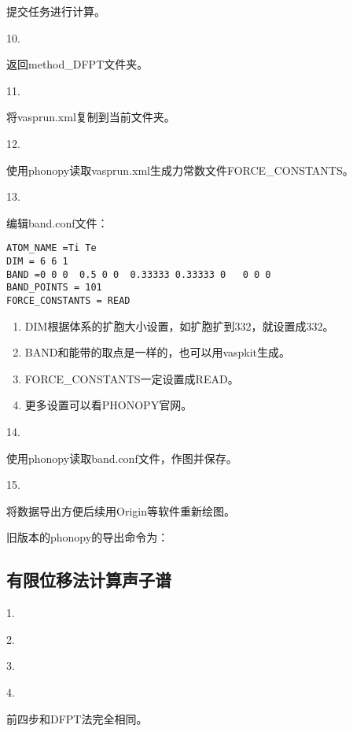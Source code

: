 提交任务进行计算。

10.

返回method\_DFPT文件夹。

11.

将vasprun.xml复制到当前文件夹。

12.

使用phonopy读取vasprun.xml生成力常数文件FORCE\_CONSTANTS。

13.

编辑band.conf文件：
\begin{lstlisting}[caption=band.conf]
ATOM_NAME =Ti Te
DIM = 6 6 1
BAND =0 0 0  0.5 0 0  0.33333 0.33333 0   0 0 0
BAND_POINTS = 101
FORCE_CONSTANTS = READ
\end{lstlisting}

\begin{enumerate}
    \item DIM根据体系的扩胞大小设置，如扩胞扩到332，就设置成332。
    \item BAND和能带的取点是一样的，也可以用vaspkit生成。
    \item FORCE\_CONSTANTS一定设置成READ。
    \item 更多设置可以看PHONOPY官网。
\end{enumerate}

14.

使用phonopy读取band.conf文件，作图并保存。

15.

将数据导出方便后续用Origin等软件重新绘图。

\begin{extend}
  旧版本的phonopy的导出命令为：
\end{extend}

\subsection{有限位移法计算声子谱}\label{sec:具体计算步骤-有限位移法计算声子谱}

1.

2.

3.

4.

前四步和DFPT法完全相同。

